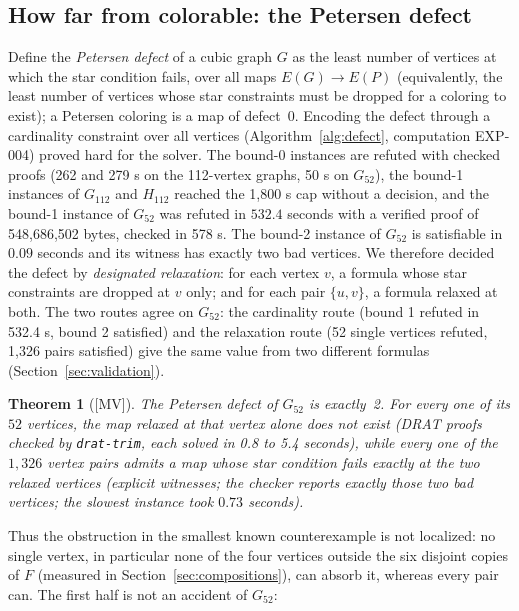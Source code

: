 \documentclass[11pt]{article}
\newtheorem{theorem}{Theorem}[section]
\theoremstyle{definition}
\theoremstyle{remark}
\newcommand{\PG}{P}
\newcommand{\Gmain}{G_{112}}
\newcommand{\Gsym}{H_{112}}
\newcommand{\Gfty}{G_{52}}
\newcommand{\mv}{\textup{[MV]}}
\begin{document}
\subsection{How far from colorable: the Petersen defect}

Define the \emph{Petersen defect} of a cubic graph $G$ as the least number of vertices at which
the star condition fails, over all maps $E(G) \to E(\PG)$ (equivalently, the least number of
vertices whose star constraints must be dropped for a coloring to exist); a Petersen coloring is
a map of defect~0. Encoding the defect through a cardinality constraint over all vertices
(Algorithm~\ref{alg:defect}, computation EXP-004) proved hard for the solver. The bound-0 instances
are refuted with checked proofs (262 and 279 s on the 112-vertex graphs, 50 s on $\Gfty$), the
bound-1 instances of $\Gmain$ and $\Gsym$ reached the 1{,}800 s cap without a decision, and the
bound-1 instance of $\Gfty$ was refuted in $532.4$ seconds with a verified proof of
548{,}686{,}502 bytes, checked in 578 s. The bound-2 instance of $\Gfty$ is satisfiable in $0.09$
seconds and its witness has exactly two bad vertices. We therefore decided the defect by
\emph{designated relaxation}: for each vertex $v$, a formula whose star
constraints are dropped at $v$ only; and for each pair $\{u, v\}$, a formula relaxed at both.
The two routes agree on $\Gfty$: the cardinality route (bound 1 refuted in 532.4 s, bound 2
satisfied) and the relaxation route (52 single vertices refuted, 1{,}326 pairs satisfied) give the
same value from two different formulas (Section~\ref{sec:validation}).

\begin{theorem}[\mv]\label{thm:defect52}
The Petersen defect of $\Gfty$ is exactly~2. For every one of its $52$ vertices, the map relaxed
at that vertex alone does not exist (DRAT proofs checked by \texttt{drat-trim}, each solved in 0.8
to 5.4 seconds), while every one of the $1{,}326$ vertex pairs admits a map whose star condition
fails exactly at the two relaxed vertices (explicit witnesses; the checker reports exactly those
two bad vertices; the slowest instance took $0.73$ seconds).
\end{theorem}

Thus the obstruction in the smallest known counterexample is not localized: no single vertex,
in particular none of the four vertices outside the six disjoint copies of $F$ (measured in
Section~\ref{sec:compositions}), can absorb it, whereas every pair can. The first half is not
an accident of $\Gfty$:
\end{document}
